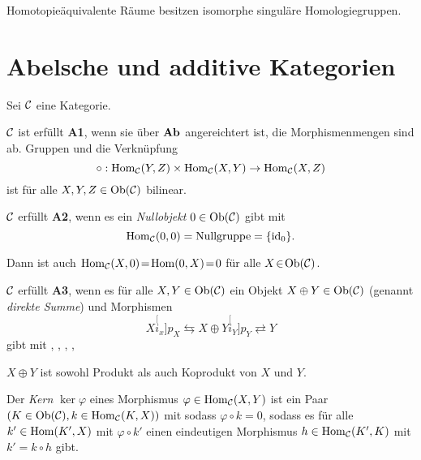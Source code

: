 \documentclass{cheat-sheet}
\begin{document}
\begin{kor}
  Homotopieäquivalente Räume besitzen isomorphe singuläre Homologiegruppen.
\end{kor}

\section{Abelsche und additive Kategorien}

Sei $\mathcal{C}$ eine Kategorie.

\begin{axiom}
  $\mathcal{C}$ ist erfüllt \textbf{A1}, wenn sie über $\mathbf{Ab}$ angereichtert ist, \dh{} die Morphismenmengen sind ab. Gruppen und die Verknüpfung
  \[ \circ : \operatorname{Hom}_{\mathcal{C}}(Y, Z) \times \operatorname{Hom}_{\mathcal{C}}(X, Y) \to \operatorname{Hom}_{\mathcal{C}}(X, Z) \]
  ist für alle $X, Y, Z \in \operatorname{Ob}(\mathcal{C})$ bilinear.
\end{axiom}

\begin{axiom}
  $\mathcal{C}$ erfüllt \textbf{A2}, wenn es ein \emph{Nullobjekt} $0 \in \operatorname{Ob}(\mathcal{C})$ gibt mit
  \[ \operatorname{Hom}_{\mathcal{C}}(0, 0) = \text{Nullgruppe} = \{ \operatorname{id}_0 \}. \]
\end{axiom}

\begin{bem}
  Dann ist auch $\operatorname{Hom}_{\mathcal{C}}(X, 0) \!=\! \operatorname{Hom}(0, X) \!=\! 0$ für alle $X \!\in\! \operatorname{Ob}(\mathcal{C})$.
\end{bem}

\begin{axiom}
  $\mathcal{C}$ erfüllt \textbf{A3}, wenn es für alle $X, Y \in \operatorname{Ob}(\mathcal{C})$ ein Objekt $X \oplus Y \in \operatorname{Ob}(\mathcal{C})$ (genannt \emph{direkte Summe}) und Morphismen
  \[ X \stackrel[i_x]{p_X}{\leftrightarrows} X \oplus Y \stackrel[i_Y]{p_Y}{\rightleftarrows} Y \]
  gibt mit
  , \enspace
  , \enspace
  , \enspace
  , \enspace
\end{axiom}

\begin{bem}
  $X \oplus Y$ ist sowohl Produkt als auch Koprodukt von $X$ und $Y$.
\end{bem}


\begin{defn}
  Der \emph{Kern} $\ker \varphi$ eines Morphismus $\varphi \in \operatorname{Hom}_{\mathcal{C}}(X, Y)$ ist
  ein Paar $(K \in \operatorname{Ob}(\mathcal{C}), k \in \operatorname{Hom}_{\mathcal{C}}(K, X))$ mit
  sodass $\varphi \circ k = 0$, sodass es für alle $k' \in \operatorname{Hom}(K', X)$ mit $\varphi \circ k'$ einen eindeutigen Morphismus $h \in \operatorname{Hom}_{\mathcal{C}}(K', K)$ mit $k' = k \circ h$ gibt.
\end{defn}
\end{document}
